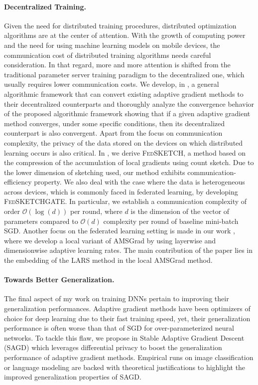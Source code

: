 \documentclass[twoside,11pt]{article}
\begin{document}
\paragraph{Decentralized Training.} 
Given the need for distributed training procedures, distributed optimization algorithms are at the center of attention. 
With the growth of computing power and the need for using machine learning models on mobile devices, the communication cost of distributed training algorithms needs careful consideration. 
In that regard, more and more attention is shifted from the traditional parameter server training paradigm to the decentralized one, which usually requires lower communication costs.
We develop, in \citep{chen2020decent}, a general algorithmic framework that can convert existing adaptive gradient methods to their decentralized counterparts and thoroughly analyze the convergence behavior of the proposed algorithmic framework showing that if a given adaptive gradient method converges, under some specific conditions, then its decentralized counterpart is also convergent.
Apart from the focus on communication complexity, the privacy of the data stored on the devices on which distributed learning occurs is also critical.
In \citep{had2020}, we derive \textsc{FedSKETCH}, a method based on the compression of the accumulation of local gradients using count sketch.
Due to the lower dimension of sketching used, our method exhibits communication-efficiency property. We also deal with the case where the data is heterogeneous across devices, which is commonly faced in federated learning, by developing \textsc{FedSKETCHGATE}.
In particular, we establish a communication complexity of order $\mathcal{O}(\log(d))$ per round, where $d$ is the dimension of the vector of parameters compared to $\mathcal{O}(d)$ complexity per round of baseline mini-batch SGD.
Another focus on the federated learning setting is made in our work \citep{karimi2020lars}, where we develop a local variant of AMSGrad by using layerwise and dimensionwise adaptive learning rates. The main contribution of the paper lies in the embedding of the LARS method in the local AMSGrad method.


\vspace{0.08in}
\paragraph{Towards Better Generalization.} 
The final aspect of my work on training DNNs pertain to improving their generalization performances.
Adaptive gradient methods have been optimizers of choice for deep learning due to their fast training speed, yet, their generalization performance is often worse than that of SGD for over-parameterized neural networks. 
To tackle this flaw, we propose in \citep{zhou2020towards} Stable Adaptive Gradient Descent (\textsc{SAGD}) which leverages differential privacy to boost the generalization performance of adaptive gradient methods.
Empirical runs on image classification or language modeling are backed with theoretical justifications to highlight the improved generalization properties of \textsc{SAGD}.
\end{document}
